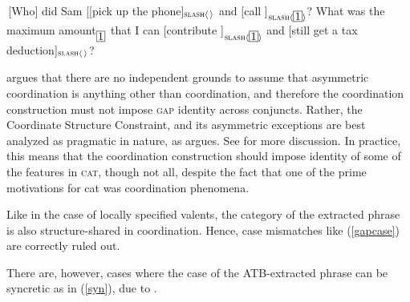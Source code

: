\documentclass[output=paper
                ,modfonts
                ,nonflat
	        ,collection
	        ,collectionchapter
	        ,collectiontoclongg
 	        ,biblatex
                ,babelshorthands
                ,newtxmath
                ,draftmode
                ,colorlinks, citecolor=brown
]{./langsci/langscibook}
\begin{document}
\begin{exe}
\ex \begin{xlista}
\ex \,[Who] did Sam [[pick up the phone]$_{\textup{\textsc{slash}} \langle \, \rangle}$ and [call \spc]$_{\textup{\textsc{slash}} \langle \avmbox{1} \rangle}$?
\ex What was the maximum amount$_{\avmbox{1}}$ that
I can [contribute \spc]$_{\textup{\textsc{slash}} \langle \avmbox{1} \rangle}$ and [still get a tax deduction]$_{\textup{\textsc{slash}} \langle \, \rangle}$?
\end{xlista}\label{assym}
\end{exe}


\citet{chavesextr} argues that there are no independent grounds to assume that asymmetric coordination is anything other than coordination, and therefore the coordination construction must not impose \textsc{gap} identity across conjuncts. Rather, the Coordinate Structure Constraint, and its asymmetric exceptions are best analyzed as
pragmatic in nature, as \citet{kehler} argues. 
See  for more discussion.
In practice, this means that the coordination construction should impose identity of some of the features in \textsc{cat}, though not all, despite the fact that one of the prime motivations for {\sc cat} was
coordination phenomena.

Like in the case of locally specified valents, the category of the extracted phrase is also structure-shared
in coordination. Hence, case mismatches like (\ref{gapcase}) are
correctly ruled out.


\begin{exe}
\ex
\begin{xlista}
\end{xlista}\label{gapcase}
\end{exe}

\noindent
There are, however, cases where the case of the ATB-extracted phrase can be syncretic as in (\ref{syn}), 
due to \citet{levineetal}. 

\begin{exe}
\ex
\begin{xlista}

\end{xlista}\label{syn}
\end{exe}
\end{document}
